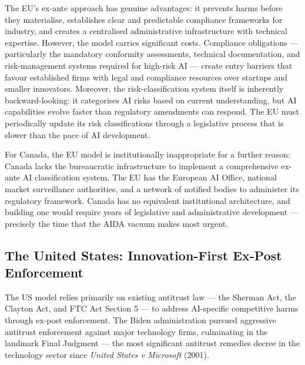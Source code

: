 The EU's ex-ante approach has genuine advantages: it prevents harms before they materialise, establishes clear and predictable compliance frameworks for industry, and creates a centralised administrative infrastructure with technical expertise. However, the model carries significant costs. Compliance obligations --- particularly the mandatory conformity assessments, technical documentation, and risk-management systems required for high-risk AI --- create entry barriers that favour established firms with legal and compliance resources over startups and smaller innovators. Moreover, the risk-classification system itself is inherently backward-looking: it categorises AI risks based on current understanding, but AI capabilities evolve faster than regulatory amendments can respond. The EU must periodically update its risk classifications through a legislative process that is slower than the pace of AI development.

For Canada, the EU model is institutionally inappropriate for a further reason: Canada lacks the bureaucratic infrastructure to implement a comprehensive ex-ante AI classification system. The EU has the European AI Office, national market surveillance authorities, and a network of notified bodies to administer its regulatory framework. Canada has no equivalent institutional architecture, and building one would require years of legislative and administrative development --- precisely the time that the AIDA vacuum makes most urgent.

\subsection{The United States: Innovation-First Ex-Post Enforcement}

The US model relies primarily on existing antitrust law --- the Sherman Act, the Clayton Act, and FTC Act Section 5 --- to address AI-specific competitive harms through ex-post enforcement. The Biden administration pursued aggressive antitrust enforcement against major technology firms, culminating in the landmark  Final Judgment --- the most significant antitrust remedies decree in the technology sector since \textit{United States v Microsoft} (2001).

